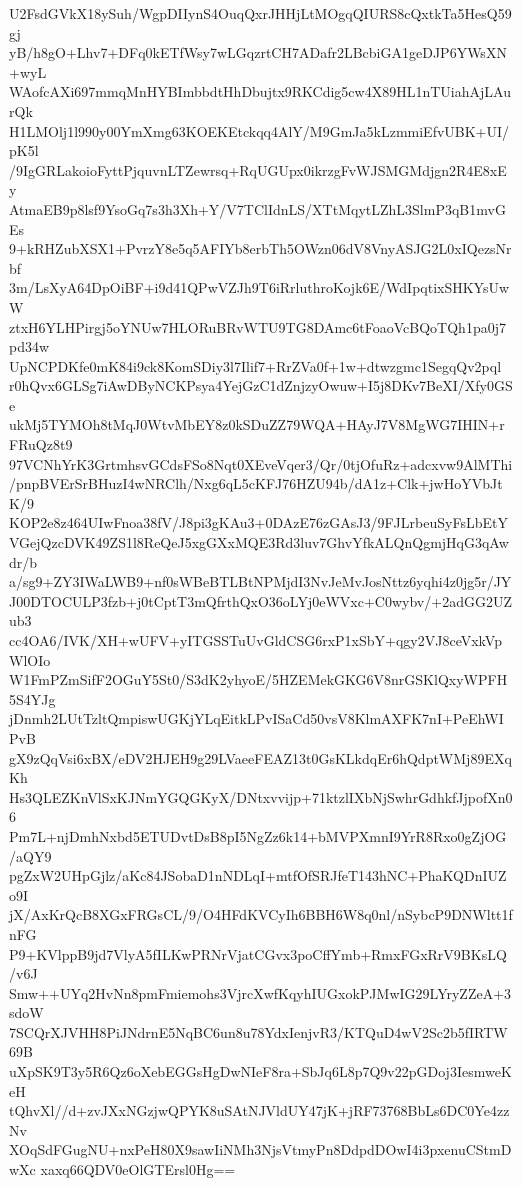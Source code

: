 U2FsdGVkX18ySuh/WgpDIIynS4OuqQxrJHHjLtMOgqQIURS8cQxtkTa5HesQ59gj
yB/h8gO+Lhv7+DFq0kETfWsy7wLGqzrtCH7ADafr2LBcbiGA1geDJP6YWsXN+wyL
WAofcAXi697mmqMnHYBImbbdtHhDbujtx9RKCdig5cw4X89HL1nTUiahAjLAurQk
H1LMOlj1l990y00YmXmg63KOEKEtckqq4AlY/M9GmJa5kLzmmiEfvUBK+UI/pK5l
/9IgGRLakoioFyttPjquvnLTZewrsq+RqUGUpx0ikrzgFvWJSMGMdjgn2R4E8xEy
AtmaEB9p8lsf9YsoGq7s3h3Xh+Y/V7TClIdnLS/XTtMqytLZhL3SlmP3qB1mvGEs
9+kRHZubXSX1+PvrzY8e5q5AFIYb8erbTh5OWzn06dV8VnyASJG2L0xIQezsNrbf
3m/LsXyA64DpOiBF+i9d41QPwVZJh9T6iRrluthroKojk6E/WdIpqtixSHKYsUwW
ztxH6YLHPirgj5oYNUw7HLORuBRvWTU9TG8DAmc6tFoaoVcBQoTQh1pa0j7pd34w
UpNCPDKfe0mK84i9ck8KomSDiy3l7Ilif7+RrZVa0f+1w+dtwzgmc1SegqQv2pql
r0hQvx6GLSg7iAwDByNCKPsya4YejGzC1dZnjzyOwuw+I5j8DKv7BeXI/Xfy0GSe
ukMj5TYMOh8tMqJ0WtvMbEY8z0kSDuZZ79WQA+HAyJ7V8MgWG7IHIN+rFRuQz8t9
97VCNhYrK3GrtmhsvGCdsFSo8Nqt0XEveVqer3/Qr/0tjOfuRz+adcxvw9AlMThi
/pnpBVErSrBHuzI4wNRClh/Nxg6qL5cKFJ76HZU94b/dA1z+Clk+jwHoYVbJtK/9
KOP2e8z464UIwFnoa38fV/J8pi3gKAu3+0DAzE76zGAsJ3/9FJLrbeuSyFsLbEtY
VGejQzcDVK49ZS1l8ReQeJ5xgGXxMQE3Rd3luv7GhvYfkALQnQgmjHqG3qAwdr/b
a/sg9+ZY3IWaLWB9+nf0sWBeBTLBtNPMjdI3NvJeMvJosNttz6yqhi4z0jg5r/JY
J00DTOCULP3fzb+j0tCptT3mQfrthQxO36oLYj0eWVxc+C0wybv/+2adGG2UZub3
cc4OA6/IVK/XH+wUFV+yITGSSTuUvGldCSG6rxP1xSbY+qgy2VJ8ceVxkVpWlOIo
W1FmPZmSifF2OGuY5St0/S3dK2yhyoE/5HZEMekGKG6V8nrGSKlQxyWPFH5S4YJg
jDnmh2LUtTzltQmpiswUGKjYLqEitkLPvISaCd50vsV8KlmAXFK7nI+PeEhWIPvB
gX9zQqVsi6xBX/eDV2HJEH9g29LVaeeFEAZ13t0GsKLkdqEr6hQdptWMj89EXqKh
Hs3QLEZKnVlSxKJNmYGQGKyX/DNtxvvijp+71ktzlIXbNjSwhrGdhkfJjpofXn06
Pm7L+njDmhNxbd5ETUDvtDsB8pI5NgZz6k14+bMVPXmnI9YrR8Rxo0gZjOG/aQY9
pgZxW2UHpGjlz/aKc84JSobaD1nNDLqI+mtfOfSRJfeT143hNC+PhaKQDnIUZo9I
jX/AxKrQcB8XGxFRGsCL/9/O4HFdKVCyIh6BBH6W8q0nl/nSybcP9DNWltt1fnFG
P9+KVlppB9jd7VlyA5fILKwPRNrVjatCGvx3poCffYmb+RmxFGxRrV9BKsLQ/v6J
Smw++UYq2HvNn8pmFmiemohs3VjrcXwfKqyhIUGxokPJMwIG29LYryZZeA+3sdoW
7SCQrXJVHH8PiJNdrnE5NqBC6un8u78YdxIenjvR3/KTQuD4wV2Sc2b5fIRTW69B
uXpSK9T3y5R6Qz6oXebEGGsHgDwNIeF8ra+SbJq6L8p7Q9v22pGDoj3IesmweKeH
tQhvXl//d+zvJXxNGzjwQPYK8uSAtNJVldUY47jK+jRF73768BbLs6DC0Ye4zzNv
XOqSdFGugNU+nxPeH80X9sawIiNMh3NjsVtmyPn8DdpdDOwI4i3pxenuCStmDwXc
xaxq66QDV0eOlGTErsl0Hg==
